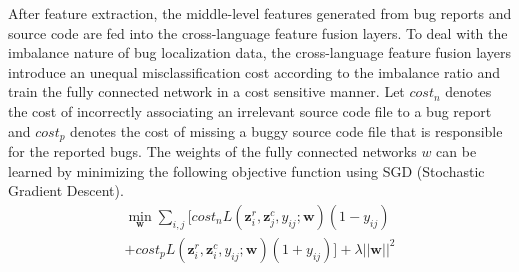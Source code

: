After feature extraction, the middle-level features generated from bug reports and source code are fed into the cross-language feature fusion layers. To deal with the imbalance nature of bug localization data, the cross-language feature fusion layers introduce an unequal misclassification cost according to the imbalance ratio and train the fully connected network in a cost sensitive manner. Let $cost_n$ denotes the cost of incorrectly associating an irrelevant source code file to a bug report and $cost_p$ denotes the cost of missing a buggy source code file that is responsible for the reported bugs. The weights of the fully connected networks $w$ can be learned by minimizing the following objective function using SGD (Stochastic Gradient Descent).
\begin{equation}
\begin{aligned}
\label{eq:cost2}
\mathop{\min}_{\mathbf{w}}\sum_{i,j}{[cost_n L(\mathbf{z}^{r}_i, \mathbf{z}^{c}_j, y_{ij}; \mathbf{w})(1-y_{ij})} \\
 {+cost_p L(\mathbf{z}^{r}_i, \mathbf{z}^{c}_i, y_{ij}; \mathbf{w})(1+y_{ij})]}+\lambda||\mathbf{w}||^2
\end{aligned}
\end{equation}

